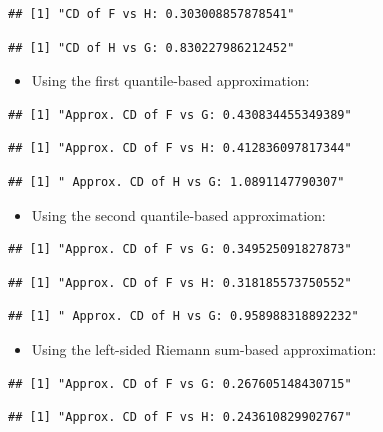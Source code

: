 \documentclass[
]{article}
\providecommand{\tightlist}{%
  \setlength{\itemsep}{0pt}\setlength{\parskip}{0pt}}
\begin{document}
\begin{verbatim}
## [1] "CD of F vs H: 0.303008857878541"
\end{verbatim}

\begin{verbatim}
## [1] "CD of H vs G: 0.830227986212452"
\end{verbatim}

\begin{itemize}
\tightlist
\item
  Using the first quantile-based approximation:
\end{itemize}

\begin{verbatim}
## [1] "Approx. CD of F vs G: 0.430834455349389"
\end{verbatim}

\begin{verbatim}
## [1] "Approx. CD of F vs H: 0.412836097817344"
\end{verbatim}

\begin{verbatim}
## [1] " Approx. CD of H vs G: 1.0891147790307"
\end{verbatim}

\begin{itemize}
\tightlist
\item
  Using the second quantile-based approximation:
\end{itemize}

\begin{verbatim}
## [1] "Approx. CD of F vs G: 0.349525091827873"
\end{verbatim}

\begin{verbatim}
## [1] "Approx. CD of F vs H: 0.318185573750552"
\end{verbatim}

\begin{verbatim}
## [1] " Approx. CD of H vs G: 0.958988318892232"
\end{verbatim}

\begin{itemize}
\tightlist
\item
  Using the left-sided Riemann sum-based approximation:
\end{itemize}

\begin{verbatim}
## [1] "Approx. CD of F vs G: 0.267605148430715"
\end{verbatim}

\begin{verbatim}
## [1] "Approx. CD of F vs H: 0.243610829902767"
\end{verbatim}
\end{document}
